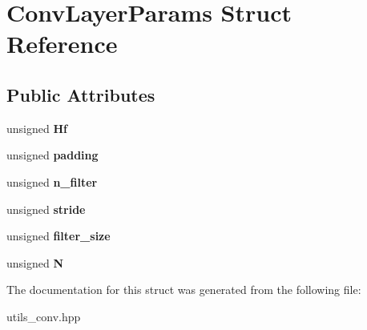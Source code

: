 \hypertarget{struct_conv_layer_params}{}\section{Conv\+Layer\+Params Struct Reference}
\label{struct_conv_layer_params}
\subsection*{Public Attributes}
\begin{DoxyCompactItemize}
\item 
\hypertarget{struct_conv_layer_params_a5c287b89252587f4ca47ff1f96be0417}{}unsigned {\bfseries Hf}\label{struct_conv_layer_params_a5c287b89252587f4ca47ff1f96be0417}

\item 
\hypertarget{struct_conv_layer_params_a1f3c7c581843bec279636537cc23497f}{}unsigned {\bfseries padding}\label{struct_conv_layer_params_a1f3c7c581843bec279636537cc23497f}

\item 
\hypertarget{struct_conv_layer_params_a655b47437125d27c52912f888c21488e}{}unsigned {\bfseries n\+\_\+filter}\label{struct_conv_layer_params_a655b47437125d27c52912f888c21488e}

\item 
\hypertarget{struct_conv_layer_params_a413880283a4f5fcb4bd772093d0aa372}{}unsigned {\bfseries stride}\label{struct_conv_layer_params_a413880283a4f5fcb4bd772093d0aa372}

\item 
\hypertarget{struct_conv_layer_params_af95630e4f19fbdd31c71d5f0266ceb89}{}unsigned {\bfseries filter\+\_\+size}\label{struct_conv_layer_params_af95630e4f19fbdd31c71d5f0266ceb89}

\item 
\hypertarget{struct_conv_layer_params_a9b76f4b76599348c8ea5045ba258d315}{}unsigned {\bfseries N}\label{struct_conv_layer_params_a9b76f4b76599348c8ea5045ba258d315}

\end{DoxyCompactItemize}


The documentation for this struct was generated from the following file\+:\begin{DoxyCompactItemize}
\item 
utils\+\_\+conv.\+hpp\end{DoxyCompactItemize}
